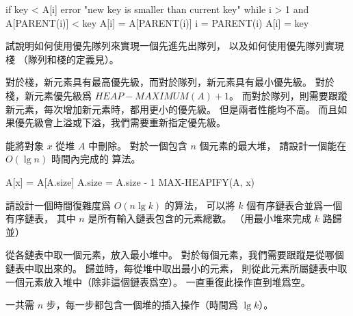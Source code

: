 \startANSWER
{}
\startCLRSCODE
if key < A[i]
	error "new key is smaller than current key"
while i > 1 and A[PARENT(i)] < key
	A[i] = A[PARENT(i)]
	i = PARENT(i)
A[i] = key
\stopCLRSCODE
\stopANSWER

\startEXERCISE
試說明如何使用優先隊列來實現一個先進先出隊列，
以及如何使用優先隊列實現棧
（隊列和棧的定義見）。
\stopEXERCISE

\startANSWER
對於棧，新元素具有最高優先級，而對於隊列，新元素具有最小優先級。
對於棧，新元素優先級爲 $HEAP-MAXIMUM(A) + 1$。
而對於隊列，則需要跟蹤新元素，每次增加新元素時，都用更小的優先級。
但是兩者性能均不高。
而且如果優先級會上溢或下溢，我們需要重新指定優先級。
\stopANSWER

\startEXERCISE
{} 能將對象 $x$ 從堆 $A$ 中刪除。
對於一個包含 $n$ 個元素的最大堆，
請設計一個能在 $O(\lg{n})$ 時間內完成的  算法。
\stopEXERCISE

\startANSWER
{}
\startCLRSCODE
A[x] = A[A.size]
A.size = A.size - 1
MAX-HEAPIFY(A, x)
\stopCLRSCODE
\stopANSWER

請設計一個時間復雜度爲 $O(n\lg{k})$ 的算法，
可以將 $k$ 個有序鏈表合並爲一個有序鏈表，
其中 $n$ 是所有輸入鏈表包含的元素總數。
（\hint 用最小堆來完成 $k$ 路歸並）
\stopEXERCISE

\startANSWER
從各鏈表中取一個元素，放入最小堆中。
對於每個元素，我們需要跟蹤是從哪個鏈表中取出來的。
歸並時，每從堆中取出最小的元素，
則從此元素所屬鏈表中取一個元素放入堆中（除非這個鏈表爲空）。
一直重復此操作直到堆爲空。

一共需 $n$ 步，每一步都包含一個堆的插入操作（時間爲 $\lg{k}$）。
\stopANSWER

\stopsection

